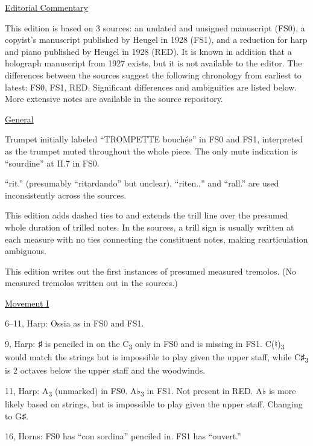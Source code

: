 \documentclass[twoside]{article}
\begin{document}
\begin{center}
\underline{\huge{Editorial Commentary}}
\end{center}

This edition is based on 3 sources: an undated and unsigned manuscript (FS0), a copyist's manuscript published by Heugel in 1928 (FS1), and a reduction for harp and piano published by Heugel in 1928 (RED). It is known in addition that a holograph manuscript from 1927 exists, but it is not available to the editor. The differences between the sources suggest the following chronology from earliest to latest: FS0, FS1, RED. Significant differences and ambiguities are listed below. More extensive notes are available in the source repository.

\begin{hangparas}{15pt}{1}
\begin{multicols}{2}

\underline{General}

Trumpet initially labeled ``TROMPETTE bouchée'' in FS0 and FS1, interpreted as the trumpet muted throughout the whole piece. The only mute indication is ``sourdine'' at II.7 in FS0.

``rit.'' (presumably ``ritardando'' but unclear), ``riten.,'' and ``rall.'' are used inconsistently across the sources.

This edition adds dashed ties to and extends the trill line over the presumed whole duration of trilled notes. In the sources, a trill sign is usually written at each measure with no ties connecting the constituent notes, making rearticulation ambiguous.

This edition writes out the first instances of presumed measured tremolos. (No measured tremolos written out in the sources.)

\underline{Movement I}

6--11, Harp: Ossia as in FS0 and FS1.

9, Harp: ♯ is penciled in on the C\textsubscript{3} only in FS0 and is missing in FS1. C(♮)\textsubscript{3} would match the strings but is impossible to play given the upper staff, while C♯\textsubscript{3} is 2 octaves below the upper staff and the woodwinds.

11, Harp: A\textsubscript{3} (unmarked) in FS0. A♭\textsubscript{3} in FS1. Not present in RED. A♭ is more likely based on strings, but is impossible to play given the upper staff. Changing to G♯.

16, Horns: FS0 has ``con sordina'' penciled in. FS1 has ``ouvert.''


\end{multicols}
\end{hangparas}
\end{document}
